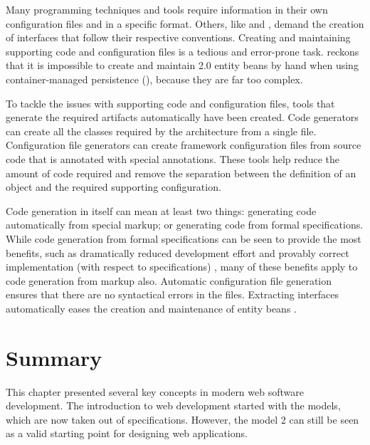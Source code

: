 Many programming techniques and tools require information in their own 
configuration files and in a specific format. Others, like 
 and , demand the creation of interfaces that 
follow their respective conventions. Creating and maintaining 
supporting code and configuration files is a tedious and error-prone 
task. \cite{j2eednd} reckons that it is impossible to create and 
maintain  2.0 entity beans by hand when using 
container-managed persistence (), because they are far too 
complex.

To tackle the issues with supporting code and configuration files, 
tools that generate the required artifacts automatically have been 
created. Code generators can create all the classes required by the 
 architecture from a single file. Configuration file 
generators can create framework configuration files from source code 
that is annotated with special annotations. These tools help reduce 
the amount of code required and remove the separation between the 
definition of an object and the required supporting configuration.

Code generation in itself can mean at least two things: generating 
code automatically from special markup; or generating code from formal 
specifications. While code generation from formal specifications can 
be seen to provide the most benefits, such as dramatically reduced 
development effort and provably correct implementation (with respect 
to specifications) \citep{codegenreq,exploringcodegen}, many of these 
benefits apply to code generation from markup also. Automatic 
configuration file generation ensures that there are no syntactical 
errors in the files. Extracting interfaces automatically eases the 
creation and maintenance of  entity beans \citep{j2eednd}.


\section{Summary}
\label{toc:webdevel:summary}

This chapter presented several key concepts in modern web software 
development. The introduction to web development started with the
 models, which are now taken out of  
specifications. However, the  model 2 can still be seen as 
a valid starting point for designing web applications.

